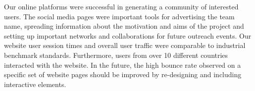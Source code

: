     Our online platforms were successful in generating a community of interested users. The social media pages were important tools for advertising the team name, spreading information about the motivation and aims of the project and setting up important networks and collaborations for future outreach events. Our website user session times and overall user traffic were comparable to industrial benchmark standards. Furthermore, users from over 10 different countries interacted with the website. In the future, the high bounce rate observed on a specific set of website pages should be improved by re-designing and including interactive elements.   
    
    

    



